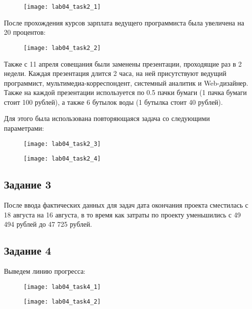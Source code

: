 \begin{figure}[h!]
	\texttt{[image: lab04\_task2\_1]}
\end{figure}

После прохождения курсов зарплата ведущего программиста была увеличена на 20 процентов:

\begin{figure}[h!]
	\texttt{[image: lab04\_task2\_2]}
\end{figure}

Также с 11 апреля совещания были заменены презентации, проходящие раз в 2 недели. Каждая презентация длится 2 часа, на ней присутствуют ведущий программист, мультимедиа-корреспондент, системный аналитик и Web-дизайнер. Также на каждой презентации используется по 0.5 пачки бумаги (1 пачка бумаги стоит 100 рублей), а также 6 бутылок воды (1 бутылка стоит 40 рублей).

Для этого была использована повторяющаяся задача со следующими параметрами:
\begin{figure}[h!]
	\texttt{[image: lab04\_task2\_3]}
\end{figure}

\begin{figure}[h!]
	\texttt{[image: lab04\_task2\_4]}
\end{figure}

\subsection*{Задание 3}

После ввода фактических данных для задач дата окончания проекта сместилась с 18 августа на 16 августа, в то время как затраты по проекту уменьшились с 49 494 рублей до 47 725 рублей.

\subsection*{Задание 4}

Выведем линию прогресса:

\begin{figure}[h!]
	\texttt{[image: lab04\_task4\_1]}
\end{figure}

\begin{figure}[h!]
	\texttt{[image: lab04\_task4\_2]}
\end{figure}

\clearpage

